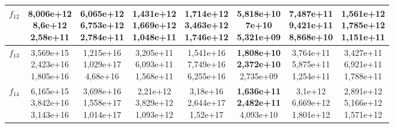 \begin{table}[t]
\begin{small}
\begin{tabular}{|c|c|c|c|c|c|c|c|}
        $f_{12}$ & \makecell{8,006e+12 \\ 8,6e+12 \\ 2,58e+11}    & \makecell{6,065e+12 \\ 6,753e+12 \\ 2,784e+11} & \makecell{1,431e+12 \\ 1,669e+12 \\ 1,048e+11} & \makecell{1,714e+12 \\ 3,463e+12 \\ 1,746e+12} & \makecell{\textbf{5,818e+10} \\ \textbf{7e+10} \\ 5,321e+09}     & \makecell{7,487e+11 \\ 9,421e+11 \\ 8,868e+10} & \makecell{1,561e+12 \\ 1,785e+12 \\ 1,151e+11}  \\\hline
        $f_{13}$ & \makecell{3,569e+15 \\ 2,423e+16 \\ 1,805e+16} & \makecell{1,215e+16 \\ 1,029e+17 \\ 4,68e+16}  & \makecell{3,205e+11 \\ 6,093e+11 \\ 1,568e+11} & \makecell{1,541e+16 \\ 7,749e+16 \\ 6,255e+16} & \makecell{\textbf{1,808e+10} \\ \textbf{2,372e+10} \\ 2,735e+09} & \makecell{3,764e+11 \\ 5,875e+11 \\ 1,254e+11} & \makecell{3,427e+11 \\ 6,921e+11 \\ 1,788e+11} \\\hline
        $f_{14}$ & \makecell{6,165e+15 \\ 3,842e+16 \\ 3,143e+16} & \makecell{3,698e+16 \\ 1,558e+17 \\ 1,014e+17} & \makecell{2,21e+12 \\ 3,829e+12 \\ 1,093e+12}  & \makecell{3,18e+16 \\ 2,644e+17 \\ 1,52e+17}  & \makecell{\textbf{1,636e+11} \\ \textbf{2,482e+11} \\ 4,093e+10} & \makecell{3,1e+12 \\ 6,669e+12 \\ 1,801e+12} & \makecell{2,891e+12 \\ 5,166e+12 \\ 1,571e+12} \\\hline

\end{tabular}
\end{small}
\end{table}
